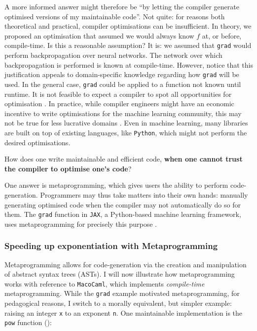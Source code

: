 A more informed answer might therefore be ``by letting the compiler generate optimised versions of my maintainable code''. Not quite: for reasons both theoretical and practical, compiler optimisations can be insufficient. In theory, we proposed an optimisation that assumed we would always know $f$ at, or before, compile-time. Is this a reasonable assumption? It is: we assumed that \texttt{grad} would perform backpropagation over neural networks. The network over which backpropagation is performed is known at compile-time. However, notice that this justification appeals to domain-specific knowledge regarding how \texttt{grad} will be used. In the general case, \texttt{grad} could be applied to a function not known until runtime. It is not feasible to expect a compiler to spot all opportunities for optimisation \citep{rice-53}. In practice, while compiler engineers might have an economic incentive to write optimisations for the machine learning community, this may not be true for less lucrative domains \citep{robinson-01}. Even in machine learning, many libraries are built on top of existing languages, like \texttt{Python}, which might not perform the desired optimisations.

How does one write maintainable and efficient code, \textbf{when one cannot trust the compiler to optimise one's code}?

One answer is metaprogramming, which gives users the ability to perform code-generation. Programmers may thus take matters into their own hands: manually generating optimised code when the compiler may not automatically do so for them. The \texttt{grad} function in \texttt{JAX}, a Python-based machine learning framework, uses metaprogramming for precisely this purpose \citep{jax-grad-metaprogramming}.

\subsubsection{Speeding up exponentiation with Metaprogramming}
Metaprogramming allows for code-generation via the creation and manipulation of abstract syntax trees (ASTs). I will now illustrate how metaprogramming works with reference to \texttt{MacoCaml}, which implements \textit{compile-time} metaprogramming. While the \texttt{grad} example motivated metaprogramming, for pedagogical reasons, I switch to a morally equivalent, but simpler example: raising an integer \texttt{x} to an exponent \texttt{n}. One maintainable implementation is the \texttt{pow} function ():

